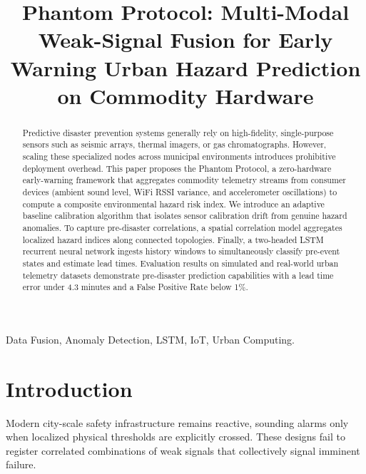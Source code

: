 \documentclass[conference]{IEEEtran}
\begin{document}
\title{Phantom Protocol: Multi-Modal Weak-Signal Fusion for Early Warning Urban Hazard Prediction on Commodity Hardware}

\author{
}

\maketitle

\begin{abstract}
Predictive disaster prevention systems generally rely on high-fidelity, single-purpose sensors such as seismic arrays, thermal imagers, or gas chromatographs. However, scaling these specialized nodes across municipal environments introduces prohibitive deployment overhead. This paper proposes the Phantom Protocol, a zero-hardware early-warning framework that aggregates commodity telemetry streams from consumer devices (ambient sound level, WiFi RSSI variance, and accelerometer oscillations) to compute a composite environmental hazard risk index. We introduce an adaptive baseline calibration algorithm that isolates sensor calibration drift from genuine hazard anomalies. To capture pre-disaster correlations, a spatial correlation model aggregates localized hazard indices along connected topologies. Finally, a two-headed LSTM recurrent neural network ingests history windows to simultaneously classify pre-event states and estimate lead times. Evaluation results on simulated and real-world urban telemetry datasets demonstrate pre-disaster prediction capabilities with a lead time error under 4.3 minutes and a False Positive Rate below 1\%.
\end{abstract}

\begin{IEEEkeywords}
Data Fusion, Anomaly Detection, LSTM, IoT, Urban Computing.
\end{IEEEkeywords}

\section{Introduction}
Modern city-scale safety infrastructure remains reactive, sounding alarms only when localized physical thresholds are explicitly crossed. These designs fail to register correlated combinations of weak signals that collectively signal imminent failure. 
\end{document}
